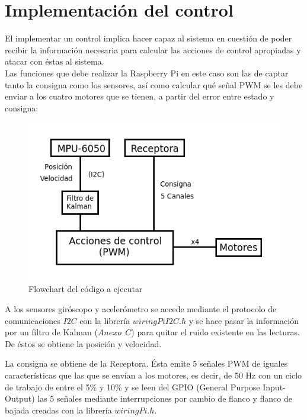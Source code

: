 \documentclass[twoside,11pt]{book}
\begin{document}
\newpage
\chapter{Implementación del control} \label{implement}

El implementar un control implica hacer capaz al sistema en cuestión de poder recibir la información necesaria para calcular las acciones de control apropiadas y atacar con éstas al sistema. \\

Las funciones que debe realizar la Raspberry Pi en este caso son las de captar tanto la consigna como los sensores, así como calcular qué señal PWM se les debe enviar a los cuatro motores que se tienen, a partir del error entre estado y consigna: 

\begin{figure}[h!]
\begin{center}
\includegraphics[scale=0.6,bb=0 0 300 230]{images/flowchart.png}
\caption{Flowchart del código a ejecutar}
\label{flowchart}
\end{center}
\end{figure}

A los sensores giróscopo y acelerómetro se accede mediante el protocolo de comunicaciones $I2C$ con la librería $wiringPiI2C.h$ y se hace pasar la información por un filtro de Kalman ($Anexo\>\>C$) para quitar el ruido existente en las lecturas. De éstos se obtiene la posición y velocidad.

La consigna se obtiene de la Receptora. Ésta emite 5 señales PWM de iguales características que las que se envían a los motores, es decir, de 50 Hz con un ciclo de trabajo de entre el 5\% y 10\% y se leen del GPIO (General Purpose Input-Output) las 5 señales mediante interrupciones por cambio de flanco y flanco de bajada creadas con la librería $wiringPi.h$.
\end{document}
